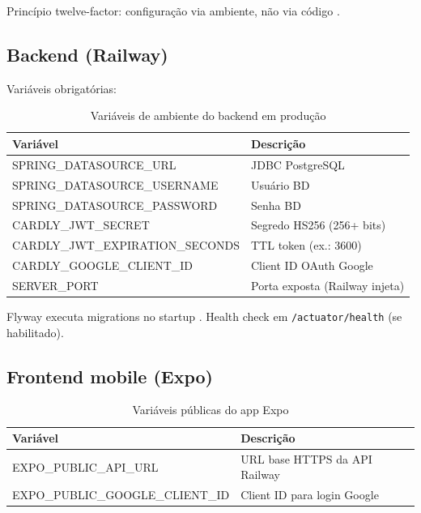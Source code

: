 Princípio twelve-factor: configuração via ambiente, não via código \cite{twelve_factor}.

\subsection{Backend (Railway)}

Variáveis obrigatórias:

\begin{table}[htbp]
    \caption{Variáveis de ambiente do backend em produção}
    \label{tab:env-backend}
    \centering
    \small
    \begin{tabular}{ll}
        \toprule
        \textbf{Variável} & \textbf{Descrição} \\
        \midrule
        SPRING\_DATASOURCE\_URL & JDBC PostgreSQL \\
        SPRING\_DATASOURCE\_USERNAME & Usuário BD \\
        SPRING\_DATASOURCE\_PASSWORD & Senha BD \\
        CARDLY\_JWT\_SECRET & Segredo HS256 (256+ bits) \\
        CARDLY\_JWT\_EXPIRATION\_SECONDS & TTL token (ex.: 3600) \\
        CARDLY\_GOOGLE\_CLIENT\_ID & Client ID OAuth Google \\
        SERVER\_PORT & Porta exposta (Railway injeta) \\
        \bottomrule
    \end{tabular}
\end{table}

Flyway executa migrations no startup \cite{flyway_docs}. Health check em \texttt{/actuator/health} (se habilitado).

\subsection{Frontend mobile (Expo)}

\begin{table}[htbp]
    \caption{Variáveis públicas do app Expo}
    \label{tab:env-frontend}
    \centering
    \small
    \begin{tabular}{ll}
        \toprule
        \textbf{Variável} & \textbf{Descrição} \\
        \midrule
        EXPO\_PUBLIC\_API\_URL & URL base HTTPS da API Railway \\
        EXPO\_PUBLIC\_GOOGLE\_CLIENT\_ID & Client ID para login Google \\
        \bottomrule
    \end{tabular}
\end{table}

